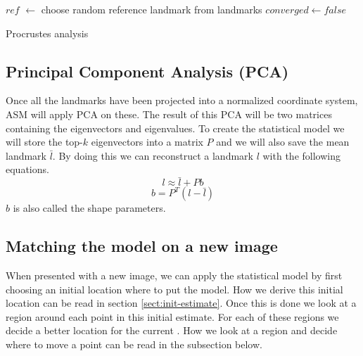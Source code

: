 \documentclass[a4paper]{article}
\begin{document}
\begin{algorithm}[H]
\BlankLine

$ref$ $\leftarrow$ choose random reference landmark from landmarks\;
$converged \leftarrow false$\;
 \caption{Procrustes analysis}
 \label{algo:procr}
\end{algorithm}

\subsection{Principal Component Analysis (PCA)}
Once all the landmarks have been projected into a normalized coordinate system, ASM will apply PCA on these.
The result of this PCA will be two matrices containing the eigenvectors and eigenvalues.
To create the statistical model we will store the top-$k$ eigenvectors into a matrix $P$ and we will also save the mean landmark $\bar{l}$.
By doing this we can reconstruct a landmark $l$ with the following equations.
\begin{equation}
l \approx \bar{l} + Pb
\end{equation}
\begin{equation}
b = P^T (l - \bar{l})
\end{equation}
$b$ is also called the shape parameters.

\subsection{Matching the model on a new image}
When presented with a new image, we can apply the statistical model by first choosing an initial location where to put the model. 
How we derive this initial location can be read in section \ref{sect:init-estimate}.
Once this is done we look at a region around each point in this initial estimate.
For each of these regions we decide a better location for the current . 
How we look at a region and decide where to move a point can be read in the subsection below.
\end{document}

